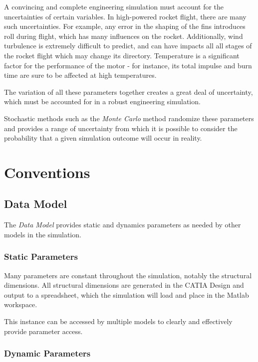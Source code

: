 \documentclass[]{book}
\begin{document}
A convincing and complete engineering simulation must account for the
uncertainties of certain variables. In high-powered rocket flight, there
are many such uncertainties. For example, any error in the shaping of
the fins introduces roll during flight, which has many influences on the
rocket. Additionally, wind turbulence is extremely difficult to predict,
and can have impacts all all stages of the rocket flight which may
change its directory. Temperature is a significant factor for the
performance of the motor - for instance, its total impulse and burn time
are sure to be affected at high temperatures.

The variation of all these parameters together creates a great deal of
uncertainty, which must be accounted for in a robust engineering
simulation.

Stochastic methods such as the \emph{Monte Carlo} method randomize these
parameters and provides a range of uncertainty from which it is possible
to consider the probability that a given simulation outcome will occur
in reality.

\chapter{Conventions}\label{conventions}

\section{Data Model}\label{data-model}

The \emph{Data Model} provides static and dynamics parameters as needed
by other models in the simulation.

\subsection{Static Parameters}\label{static-parameters-1}

Many parameters are constant throughout the simulation, notably the
structural dimensions. All structural dimensions are generated in the
CATIA Design and output to a spreadsheet, which the simulation will load
and place in the Matlab workspace.

This instance can be accessed by multiple models to clearly and
effectively provide parameter access.

\subsection{Dynamic Parameters}\label{dynamic-parameters-1}
\end{document}
